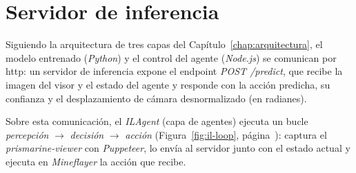 \section{Servidor de inferencia}
Siguiendo la arquitectura de tres capas del Capítulo~\ref{chap:arquitectura}, el
modelo entrenado (\textit{Python}) y el control del agente (\textit{Node.js}) se comunican
por \acrshort{http}: un servidor de inferencia expone el \gls{endpoint} \textit{POST /predict},
que recibe la imagen del visor y el estado del agente y responde con la acción predicha, su
confianza y el desplazamiento de cámara desnormalizado (en radianes).

Sobre esta comunicación, el \textit{ILAgent} (capa de agentes) ejecuta un bucle
\textit{percepción} $\rightarrow$ \textit{decisión} $\rightarrow$ \textit{acción}
(Figura~\ref{fig:il-loop}, página~\pageref{fig:il-loop}): captura el
\textit{prismarine-viewer} con \textit{Puppeteer}, lo envía al servidor junto con el estado
actual y ejecuta en \textit{Mineflayer} la acción que recibe.


